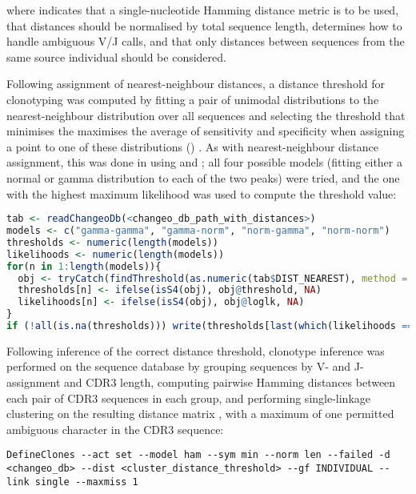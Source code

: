 \noindent where  indicates that a single-nucleotide Hamming distance metric is to be used,  that distances should be normalised by total sequence length,  determines how to handle ambiguous V/J calls, and  that only distances between sequences from the same source individual should be considered.

Following assignment of nearest-neighbour distances, a distance threshold for clonotyping was computed by fitting a pair of unimodal distributions to the nearest-neighbour distribution over all sequences and selecting the threshold that minimises the maximises the average of sensitivity and specificity when assigning a point to one of these distributions () \parencite{nouri2018threshold}. As with nearest-neighbour distance assignment, this was done in  using  and ; all four possible models (fitting either a normal or gamma distribution to each of the two peaks) were tried, and the one with the highest maximum likelihood was used to compute the threshold value:

\begin{lstlisting}[language=R]
tab <- readChangeoDb(<changeo_db_path_with_distances>)
models <- c("gamma-gamma", "gamma-norm", "norm-gamma", "norm-norm")
thresholds <- numeric(length(models))
likelihoods <- numeric(length(models))
for(n in 1:length(models)){
  obj <- tryCatch(findThreshold(as.numeric(tab$DIST_NEAREST), method = "gmm", model = "hmm", cutoff = "opt"), error = function(e) return(e$message), warning = function(w) return(w$message))
  thresholds[n] <- ifelse(isS4(obj), obj@threshold, NA)
  likelihoods[n] <- ifelse(isS4(obj), obj@loglk, NA)
}
if (!all(is.na(thresholds))) write(thresholds[last(which(likelihoods == max(likelihoods, na.rm = TRUE))], <threshold_output_path>)
\end{lstlisting} 

\noindent Following inference of the correct distance threshold, clonotype inference was performed on the sequence database by grouping sequences by V- and J-assignment and CDR3 length, computing pairwise Hamming distances between each pair of CDR3 sequences in each group, and performing single-linkage clustering on the resulting distance matrix \parencite{gupta2017hierarchical}, with a maximum of one permitted ambiguous  character in the CDR3 sequence:

\begin{lstlisting}
DefineClones --act set --model ham --sym min --norm len --failed -d <changeo_db> --dist <cluster_distance_threshold> --gf INDIVIDUAL --link single --maxmiss 1
\end{lstlisting}

